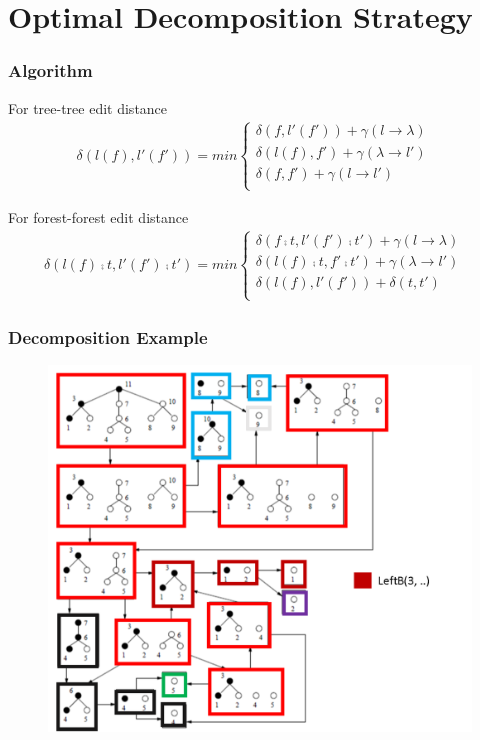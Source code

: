 \documentclass{beamer}
\begin{document}
\section{Optimal Decomposition Strategy}
\begin{frame}
\frametitle{Algorithm}
\begin{block}{For tree-tree edit distance}
\begin{align*}
&\delta(l(f), l'(f')) = min \begin{cases}
	  \delta(f , l'(f')) + \gamma(l \to \lambda) \\ %
      \delta(l(f), f') + \gamma(\lambda \to l') \\ %
     \delta(f, f') + \gamma(l \to l') & \\ %
      \end{cases} &
\end{align*}
\end{block}
\begin{block}{For forest-forest edit distance}
\begin{align*}
&\delta(l(f) \comp t, l'(f') \comp t') = min \begin{cases}
	  \delta(f \comp t , l'(f') \comp t') + \gamma(l \to \lambda) \\ %
      \delta(l(f) \comp t, f' \comp t') + \gamma(\lambda \to l') \\ %
     \delta(l(f), l'(f')) + \delta(t, t') & \\ %
      \end{cases} &
\end{align*}
\end{block}
\end{frame}


\begin{frame}
\frametitle{Decomposition Example}
\begin{figure}
	\includegraphics[width=0.7\linewidth]{DecompositionExample}
	\label{Decomposition Example} 
	\centering
\end{figure}
\end{frame}
\end{document}
